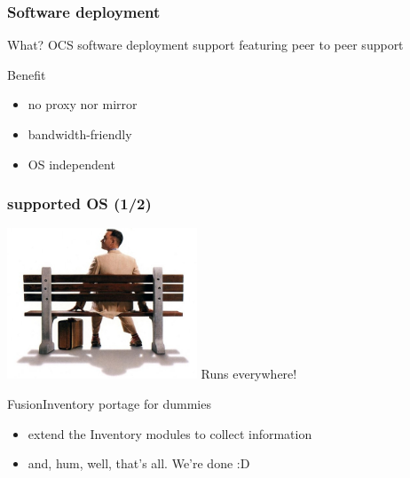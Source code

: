 \begin{frame}
    \frametitle{Software deployment}

    \begin{block}{What?}
    OCS software deployment support featuring peer to peer support
    \end{block}

    \begin{block}{Benefit}
    \begin{itemize}
        \item no proxy nor mirror
        \item bandwidth-friendly
        \item OS independent
    \end{itemize}
    \end{block}
\end{frame}

\begin{frame}
    \frametitle{supported OS (1/2)}

    \includegraphics[height=4.5cm]{pics/forrest.jpg}
    Runs everywhere!

    \pause

    \begin{block}{FusionInventory portage for dummies}
        \begin{itemize}
            \item extend the Inventory modules to collect information
            \item and, hum, well, that's all. We're done :D
        \end{itemize}
    \end{block}
\end{frame}

